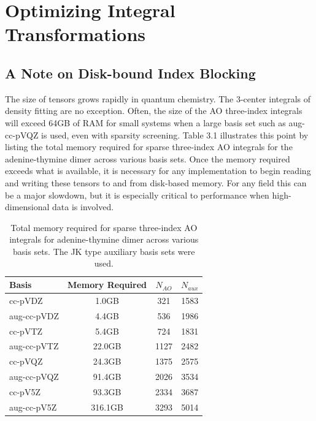 \chapter{Optimizing Integral Transformations}

\section{A Note on Disk-bound Index Blocking}

The size of tensors grows rapidly in quantum chemistry. The 3-center integrals of density fitting are no exception.
Often, the size of the AO three-index integrals will exceed 64GB of RAM for small systems when
a large basis set such as aug-cc-pVQZ is used, even with sparsity screening. Table 3.1 illustrates this point by listing
the total memory required for sparse three-index AO integrals for the adenine-thymine dimer across various basis sets. Once the memory required
exceeds what is available, it is necessary for
any implementation to begin reading and writing these tensors to and from disk-based memory. For any field this can
be a major slowdown, but it is especially critical to performance when high-dimensional data is involved. 

\begingroup
\begin{table}[H]
\centering
\renewcommand{\baselinestretch}{1}
\caption{Total memory required for sparse three-index AO integrals for adenine-thymine dimer across various basis sets.
The JK type auxiliary basis sets were used.}
\begin{tabular}{l ccc}
\multicolumn{1}{l}{\textbf{Basis}} &
\multicolumn{1}{c}{\textbf{Memory Required}} &
\multicolumn{1}{c}{\textbf{$N_{AO}$}} &
\multicolumn{1}{c}{\textbf{$N_{aux}$}} \\
\hline

   cc-pVDZ   &      1.0GB    &    321   &     1583\\
aug-cc-pVDZ  &      4.4GB   &     536  &     1986\\
   cc-pVTZ   &      5.4GB    &    724   &     1831\\
aug-cc-pVTZ  &     22.0GB   &    1127  &     2482\\
   cc-pVQZ   &     24.3GB    &   1375   &     2575\\
aug-cc-pVQZ  &     91.4GB   &    2026  &     3534\\
   cc-pV5Z   &     93.3GB    &   2334   &     3687\\
aug-cc-pV5Z  &    316.1GB   &    3293  &     5014\\ 

\end{tabular}
\end{table}
\endgroup

